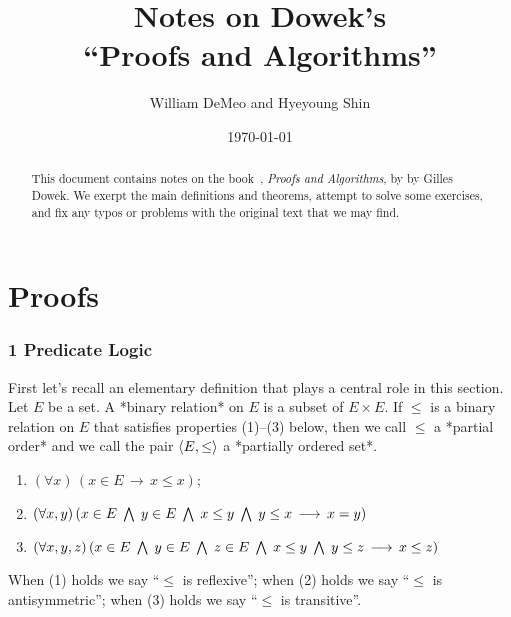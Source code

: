 % 


\starON
\title[Notes on Dowek]{Notes on Dowek's\\
 ``Proofs and Algorithms''}
\date{\today}
\author[W.~DeMeo and H.~Shin]{William DeMeo and Hyeyoung Shin}
\address{University of Hawaii}

\begin{abstract}
This document contains notes on the book~\cite{MR3012378}, {\it Proofs and
Algorithms}, by by Gilles Dowek.  We exerpt the main definitions and theorems,
attempt to solve some exercises, and fix any typos or problems with the original
text that we may find.
\end{abstract}

\maketitle


\part{Proofs}

\section{1 Predicate Logic}


First let's recall an elementary definition that plays a central role in this
section.
Let $E$ be a set.  A *binary relation* on $E$ is a subset of $E\times E$.
If $\leq$ is a binary relation on $E$ that satisfies properties (1)--(3) below, 
then we call $\leq$ a *partial order* and we call the pair
$\langle E, \leq\rangle$ a *partially ordered set*.
\begin{enumerate}
\item $(\forall x) \, (x\in E \, \longrightarrow \, x\leq x)$;
\item $(\forall x, y)\, %
(x\in E\; \Meet \; y\in E \; \Meet \; x\leq y \; \Meet \; y \leq x \,
\longrightarrow\, x=y)$
\item $(\forall x, y, z)\, %
(x\in E\; \Meet \; y\in E \; \Meet \; z\in E \; \Meet \; x\leq y \; \Meet \; y \leq z \,
\longrightarrow\, x\leq z)$
\end{enumerate}
When (1) holds we say ``$\leq$ is reflexive''; 
when (2) holds we say ``$\leq$ is antisymmetric''; 
when (3) holds we say ``$\leq$ is transitive''. 

